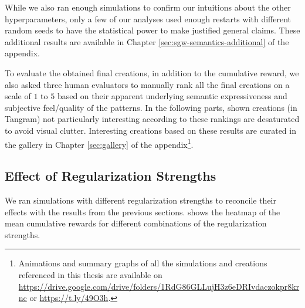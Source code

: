 While we also ran enough simulations to confirm our intuitions about the other hyperparameters, only a few of our analyses used enough restarts with different random seeds to have the statistical power to make justified general claims.
These additional results are available in Chapter \ref{sec:sgw-semantics-additional} of the appendix.

To evaluate the obtained final creations, in addition to the cumulative reward, we also asked three human evaluators to manually rank all the final creations on a scale of \(1\) to \(5\) based on their apparent underlying semantic expressiveness and subjective feel/quality of the patterns.
In the following parts, shown creations (in Tangram) not particularly interesting according to these rankings are desaturated to avoid visual clutter.
Interesting creations based on these results are curated in the gallery in Chapter \ref{sec:gallery} of the appendix\footnote[1]{Animations and summary graphs of all the simulations and creations referenced in this thesis are available on \url{https://drive.google.com/drive/folders/1RdG86GLLujH3z6eDRIvdaczokpr8krnc} or \url{https://t.ly/49O3h}.}.




\subsection{Effect of Regularization Strengths}
\label{sec:alpha-beta-semantics}
We ran simulations with different regularization strengths to reconcile their effects with the results from the previous sections.
 shows the heatmap of the mean cumulative rewards for different combinations of the regularization strengths.

